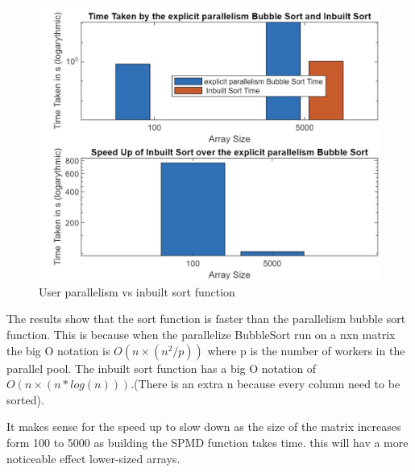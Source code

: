 \begin{figure}[H]
 \centering
 \includegraphics[width=0.6\columnwidth]{Figures/expPar_2}
 \caption{User parallelism vs inbuilt sort function}
 \label{fig:expPar}
\end{figure}

The results show that the sort function is faster than the parallelism bubble sort function.
This is because when the parallelize BubbleSort run on a nxn matrix the big O notation is $O(n×(n^2/p))$ where p is the number of workers in the parallel pool. 
The inbuilt sort function has a big O notation of $O(n×(n*log(n)))$.(There is an extra n because every column need to be sorted).

It makes sense for the speed up to slow down as the size of the matrix increases form 100 to 5000 as building the SPMD function takes time. this will hav a more noticeable effect lower-sized arrays.
